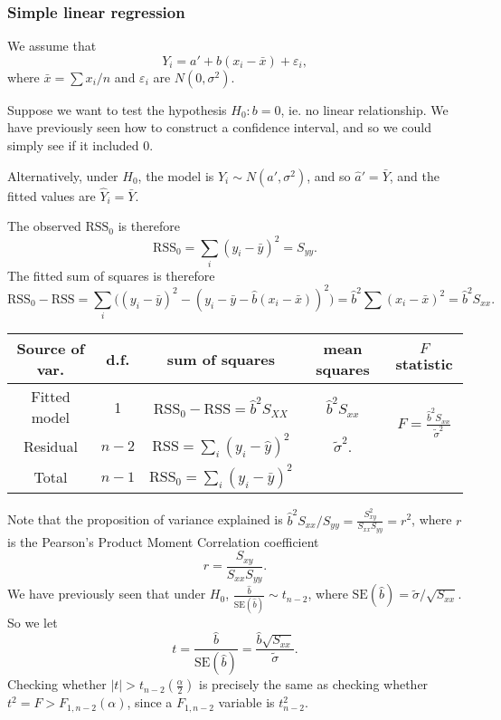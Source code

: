 \documentclass[a4paper]{article}
\begin{document}
\subsubsection{Simple linear regression}
We assume that
\[
  Y_i = a' + b(x_i - \bar x) + \varepsilon_i,
\]
where $\bar x = \sum x_i/n$ and $\varepsilon_i$ are $N(0, \sigma^2)$.

Suppose we want to test the hypothesis $H_0: b = 0$, ie. no linear relationship. We have previously seen how to construct a confidence interval, and so we could simply see if it included 0.

Alternatively, under $H_0$, the model is $Y_i \sim N(a', \sigma^2)$, and so $\hat a' = \bar Y$, and the fitted values are $\hat Y_i = \bar Y$.

The observed $\mathrm{RSS}_0$ is therefore
\[
  \mathrm{RSS}_0 = \sum_i (y_i - \bar y)^2 = S_{yy}.
\]
The fitted sum of squares is therefore
\[
  \mathrm{RSS}_0 - \mathrm{RSS} = \sum_i \big((y_i - \bar y)^2 - (y_i - \bar y - \hat{b}(x_i - \bar x))^2\big) = \hat{b}^2 \sum (x_i - \bar x)^2 = \hat{b}^2 S_{xx}.
\]
\begin{center}
  \begin{tabular}{ccccc}
    \toprule
    Source of var. & d.f. & sum of squares & mean squares & $F$ statistic\\
    \midrule
    Fitted model & 1 & $\mathrm{RSS}_0 - \mathrm{RSS} = \hat{b}^2 S_{XX}$ & $\hat{b}^2 S_{xx}$ & \multirow{2}{*}{$F = \frac{\hat{b}^2 S_{xx}}{\tilde{\sigma}^2}$}\\
    Residual & $n - 2$ & $\mathrm{RSS} = \sum_i (y_i- \hat y)^2$ &  $\tilde{\sigma}^2$.\\
    \midrule
    Total & $n - 1$ & $\mathrm{RSS}_0 = \sum_i (y_i - \bar y)^2$\\
    \bottomrule
  \end{tabular}
\end{center}
Note that the proposition of variance explained is $\hat{b}^2S_{xx}/S_{yy} = \frac{S_{xy}^2}{S_{xx}S_{yy}} = r^2$, where $r$ is the Pearson's Product Moment Correlation coefficient
\[
  r = \frac{S_{xy}}{S_{xx}S_{yy}}.
\]
We have previously seen that under $H_0$, $\frac{\hat{b}}{\mathrm{SE}(\hat{b})} \sim t_{n - 2}$, where $\mathrm{SE}(\hat{b}) = \tilde{\sigma}/\sqrt{S_{xx}}$. So we let
\[
  t = \frac{\hat{b}}{\mathrm{SE}(\hat{b})} = \frac{\hat{b}\sqrt{S_{xx}}}{\tilde{\sigma}}.
\]
Checking whether $|t| > t_{n - 2}\left(\frac{\alpha}{2}\right)$ is precisely the same as checking whether $t^2 = F > F_{1, n - 2}(\alpha)$, since a $F_{1, n - 2}$ variable is $t_{n - 2}^2$.
\end{document}
